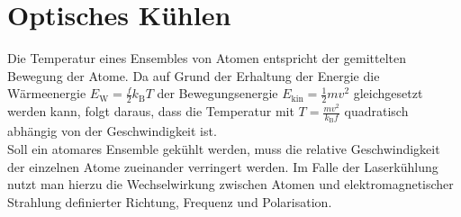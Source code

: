 \documentclass[
class=book,
accentcolor=1b,
custommargins=geometry,
fontsize=11pt,
thesis={type=Versuchsanleitung},
ruledheaders=all,
headline=false,
instbox=false,
marginpar=false,
title=small,
ignore-missing-data=true,
twoside=false,
logofile=apqdesign/tuda_logo.pdf,
pdfa=false %
]{apqpub}
\begin{document}
				\section{Optisches Kühlen}			
				Die Temperatur eines Ensembles von Atomen entspricht der gemittelten Bewegung der Atome. Da auf Grund der
				Erhaltung der Energie die Wärmeenergie $E_{\text{W}} = \frac{f}{2}k_{\text{B}}T$ der Bewegungsenergie $E_{\text{kin}} = \frac{1}{2}mv^2$ gleichgesetzt werden kann, folgt daraus, dass die Temperatur mit $T = \frac{mv^2}{k_{\text{B}} f}$ quadratisch abhängig von der Geschwindigkeit ist.\\ 
				Soll ein atomares Ensemble gekühlt werden, muss die relative Geschwindigkeit der einzelnen Atome zueinander
				verringert werden. Im Falle der Laserkühlung nutzt man hierzu die Wechselwirkung zwischen Atomen und
				elektromagnetischer Strahlung definierter Richtung, Frequenz und Polarisation.
				
\end{document}
